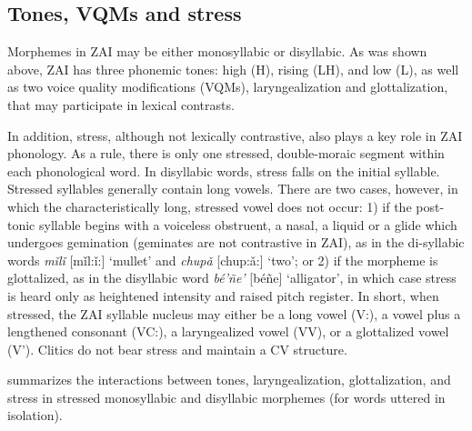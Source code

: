 \subsection{Tones, VQMs and stress}\label{tones}

Morphemes in ZAI may be either monosyllabic or disyllabic. As was shown above, ZAI has three phonemic tones: high (H), rising (LH), and low (L), as well as two voice quality modifications (VQMs), laryngealization and glottalization, that may participate in lexical contrasts. 

In addition, stress, although not lexically contrastive, also plays a key role in ZAI phonology. As a rule, there is only one stressed, double-moraic segment within each phonological word. In disyllabic words, stress falls on the initial syllable. Stressed syllables generally contain long vowels. There are two cases, however, in which the characteristically long, stressed vowel does not occur: 1) if the post-tonic syllable begins with a voiceless obstruent, a nasal, a liquid or a glide which undergoes gemination (geminates are not contrastive in ZAI), as in the di-syllabic words \textit{m\v{i}l\v{i}} [m\v{i}l:\v{i}:] `mullet' and \textit{chup\v{a}} [chup:\v{a}:] `two'; or 2) if the morpheme is glottalized, as in the disyllabic word \textit{b\'{e}'ñe'} [b\'{e}ñe] `alligator', in which case stress is heard only as heightened intensity and raised pitch register. In short, when stressed, the ZAI syllable nucleus may either be a long vowel (V:), a vowel plus a lengthened consonant (VC:), a laryngealized vowel (VV), or a glottalized vowel (V'). Clitics do not bear stress and maintain a CV structure.

 summarizes the interactions between tones, laryngealization, glottalization, and stress in stressed monosyllabic and disyllabic morphemes (for words uttered in isolation).

